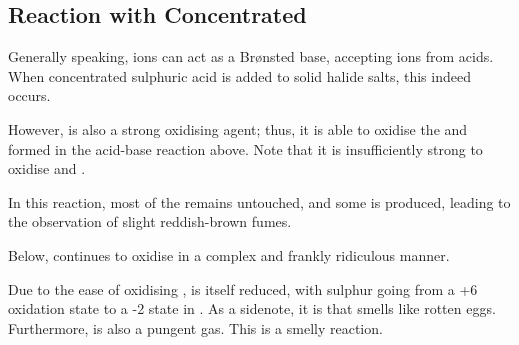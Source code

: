 

		\subsection{Reaction with Concentrated }

			Generally speaking,  ions can act as a Brønsted base, accepting  ions from acids. When concentrated sulphuric acid
			is added to solid halide salts, this indeed occurs.


			However,  is also a strong oxidising agent; thus, it is able to oxidise the  and  formed in the acid-base
			reaction above. Note that it is insufficiently strong to oxidise  and .



			In this reaction, most of the  remains untouched, and some  is produced, leading to the observation of
			slight reddish-brown fumes.


			\pagebreak
			Below,  continues to oxidise  in a complex and frankly ridiculous manner.



			Due to the ease of oxidising ,  is itself reduced, with sulphur going from a +6 oxidation state to a -2 state
			in . As a sidenote, it is  that smells like rotten eggs. Furthermore,  is also a pungent gas. This is
			a smelly reaction.

